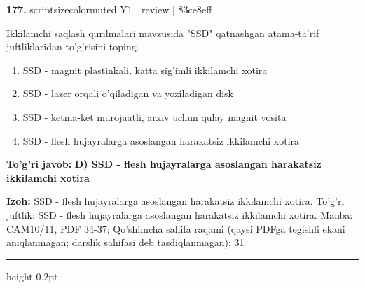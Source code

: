 \documentclass[10pt,a4paper]{article}
\begin{document}
{\bfseries\sffamily\color{ink} 177.} {scriptsizecolor{muted} Y1 | review | 83ce8eff}
\par
Ikkilamchi saqlash qurilmalari mavzusida "SSD" qatnashgan atama-ta'rif juftliklaridan to'g'risini toping.
\begin{enumerate}[label=\Alph*),leftmargin=9mm]
\item SSD - magnit plastinkali, katta sig'imli ikkilamchi xotira
\item SSD - lazer orqali o'qiladigan va yoziladigan disk
\item SSD - ketma-ket murojaatli, arxiv uchun qulay magnit vosita
\item SSD - flesh hujayralarga asoslangan harakatsiz ikkilamchi xotira
\end{enumerate}
\begin{tcolorbox}[enhanced,breakable,colback=teal!4,colframe=teal!60!black,boxrule=0.45pt,arc=1.2mm,left=2.7mm,right=2.7mm,top=1.8mm,bottom=1.8mm,before skip=2mm,after skip=2mm]
{\bfseries\sffamily\color{teal}To'g'ri javob:} \textbf{D) SSD - flesh hujayralarga asoslangan harakatsiz ikkilamchi xotira}
\par\smallskip
{\bfseries Izoh:} SSD - flesh hujayralarga asoslangan harakatsiz ikkilamchi xotira. To'g'ri juftlik: SSD - flesh hujayralarga asoslangan harakatsiz ikkilamchi xotira. Manba: CAM10/11, PDF 34-37; Qo'shimcha sahifa raqami (qaysi PDFga tegishli ekani aniqlanmagan; darslik sahifasi deb tasdiqlanmagan): 31
\end{tcolorbox}
\vspace{2mm}\hrule height 0.2pt\vspace{3mm}
\end{document}
